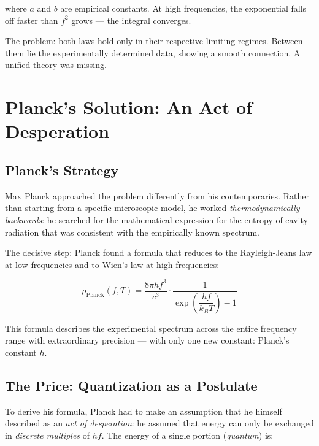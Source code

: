 where $a$ and $b$ are empirical constants. At high frequencies, the exponential 
falls off faster than $f^2$ grows — the integral converges.

The problem: both laws hold only in their respective limiting regimes. Between them 
lie the experimentally determined data, showing a smooth connection. A unified theory 
was missing.

\clearpage

\section{Planck's Solution: An Act of Desperation}
\label{sec:planck}

\subsection{Planck's Strategy}

Max Planck approached the problem differently from his contemporaries. Rather than 
starting from a specific microscopic model, he worked \emph{thermodynamically 
backwards}: he searched for the mathematical expression for the entropy of cavity 
radiation that was consistent with the empirically known spectrum.

The decisive step: Planck found a formula that reduces to the Rayleigh-Jeans law at 
low frequencies and to Wien's law at high frequencies:

\begin{equation}
    \rho_{\text{Planck}}(f, T) = \frac{8\pi h f^3}{c^3} \cdot \frac{1}{\exp\!\left(\dfrac{hf}{k_BT}\right) - 1}
    \label{eq:planck_law}
\end{equation}

This formula describes the experimental spectrum across the entire frequency range 
with extraordinary precision — with only one new constant: Planck's constant $h$.

\subsection{The Price: Quantization as a Postulate}

To derive his formula, Planck had to make an assumption that he himself described as 
an \emph{act of desperation}: he assumed that energy can only be exchanged in 
\emph{discrete multiples} of $hf$. The energy of a single portion (\emph{quantum}) is:


